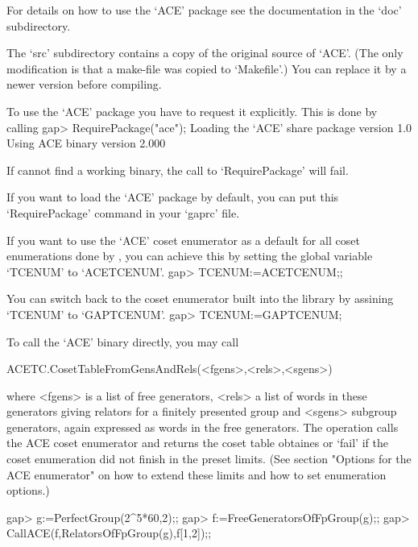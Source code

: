 For details on how to use the `ACE' package see the documentation in the
`doc' subdirectory.

The `src' subdirectory contains a copy of the original source of `ACE'. (The
only modification is that a make-file was copied to `Makefile'.) You can
replace it by a newer version before compiling.


To use the `ACE' package you have to request it explicitly. This is done by
calling 
\begintt
gap> RequirePackage("ace");
  Loading the `ACE' share package version 1.0
  Using ACE binary version 2.000
\endtt

If {\GAP} cannot find a working binary, the call to `RequirePackage' will
fail.

If you want to load the `ACE' package by default, you can put this
`RequirePackage' command in your `gaprc' file.

If you want to use the `ACE' coset enumerator as a default for all coset
enumerations done by {\GAP}, you can achieve this by setting the global
variable `TCENUM' to `ACETCENUM'.
\begintt
gap> TCENUM:=ACETCENUM;;
\endtt

You
can switch back to the coset enumerator built into the {\GAP} library by
assining `TCENUM' to `GAPTCENUM'.
\begintt
gap> TCENUM:=GAPTCENUM;
\endtt



To call the `ACE' binary directly, you may call

\>ACETC.CosetTableFromGensAndRels(<fgens>,<rels>,<sgens>)

where <fgens> is a list of free generators, <rels> a list of words in these
generators giving relators for a finitely presented group and <sgens>
subgroup generators, again expressed as words in the free generators. The
operation calls the ACE coset enumerator and returns the coset table
obtaines or `fail' if the coset enumeration did not finish in the preset
limits. (See section "Options for the ACE enumerator" on how to extend these
limits and how to set enumeration options.)

\begintt
gap> g:=PerfectGroup(2^5*60,2);;
gap> f:=FreeGeneratorsOfFpGroup(g);;
gap> CallACE(f,RelatorsOfFpGroup(g),f{[1,2]});;
\endtt


